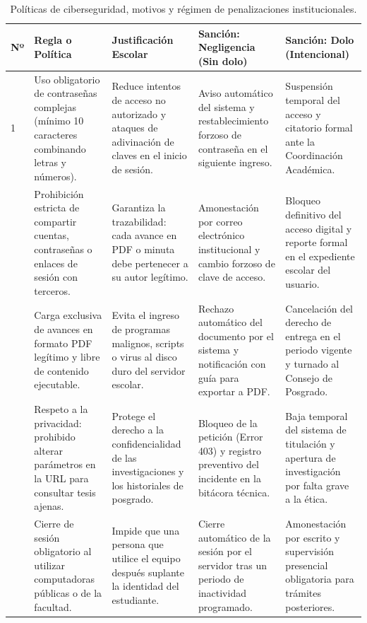 \begin{table}[H]
\centering
\scriptsize
\singlespacing
\caption{Políticas de ciberseguridad, motivos y régimen de penalizaciones institucionales.}
\label{tab:politicas_seguridad}
\begin{tabular}{p{0.4cm} p{3.2cm} p{3.4cm} p{3.8cm} p{4.0cm}}
\toprule
\textbf{Nº} & \textbf{Regla o Política} & \textbf{Justificación Escolar} & \textbf{Sanción: Negligencia (Sin dolo)} & \textbf{Sanción: Dolo (Intencional)} \\
\midrule
1 & 
Uso obligatorio de contraseñas complejas (mínimo 10 caracteres combinando letras y números). & 
Reduce intentos de acceso no autorizado y ataques de adivinación de claves en el inicio de sesión. & 
Aviso automático del sistema y restablecimiento forzoso de contraseña en el siguiente ingreso. & 
Suspensión temporal del acceso y citatorio formal ante la Coordinación Académica. \\
\addlinespace
2 & 
Prohibición estricta de compartir cuentas, contraseñas o enlaces de sesión con terceros. & 
Garantiza la trazabilidad: cada avance en PDF o minuta debe pertenecer a su autor legítimo. & 
Amonestación por correo electrónico institucional y cambio forzoso de clave de acceso. & 
Bloqueo definitivo del acceso digital y reporte formal en el expediente escolar del usuario. \\
\addlinespace
3 & 
Carga exclusiva de avances en formato PDF legítimo y libre de contenido ejecutable. & 
Evita el ingreso de programas malignos, scripts o virus al disco duro del servidor escolar. & 
Rechazo automático del documento por el sistema y notificación con guía para exportar a PDF. & 
Cancelación del derecho de entrega en el periodo vigente y turnado al Consejo de Posgrado. \\
\addlinespace
4 & 
Respeto a la privacidad: prohibido alterar parámetros en la URL para consultar tesis ajenas. & 
Protege el derecho a la confidencialidad de las investigaciones y los historiales de posgrado. & 
Bloqueo de la petición (Error 403) y registro preventivo del incidente en la bitácora técnica. & 
Baja temporal del sistema de titulación y apertura de investigación por falta grave a la ética. \\
\addlinespace
5 & 
Cierre de sesión obligatorio al utilizar computadoras públicas o de la facultad. & 
Impide que una persona que utilice el equipo después suplante la identidad del estudiante. & 
Cierre automático de la sesión por el servidor tras un periodo de inactividad programado. & 
Amonestación por escrito y supervisión presencial obligatoria para trámites posteriores. \\
\bottomrule
\end{tabular}
\end{table}

